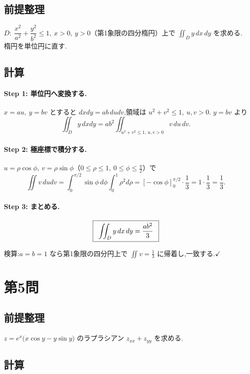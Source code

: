 \documentclass[11pt,a4paper]{article}
\begin{document}
\subsection*{前提整理}

$D:\ \dfrac{x^2}{a^2}+\dfrac{y^2}{b^2}\le1,\ x>0,\ y>0$（第1象限の四分楕円）上で
$\displaystyle\iint_D y\,dx\,dy$ を求める.楕円を単位円に直す.

\subsection*{計算}

\paragraph{Step 1: 単位円へ変換する.}
$x=au,\ y=bv$ とすると $dxdy=ab\,dudv$,領域は $u^2+v^2\le1,\ u,v>0$.
$y=bv$ より
\[
\iint_D y\,dxdy=ab^2\iint_{u^2+v^2\le1,\,u,v>0}v\,du\,dv.
\]

\paragraph{Step 2: 極座標で積分する.}
$u=\rho\cos\phi,\ v=\rho\sin\phi$（$0\le\rho\le1,\ 0\le\phi\le\frac\pi2$）で
\[
\iint v\,dudv=\int_0^{\pi/2}\!\!\sin\phi\,d\phi\int_0^1\!\rho^2 d\rho
=[-\cos\phi]_0^{\pi/2}\cdot\frac13=1\cdot\frac13=\frac13.
\]

\paragraph{Step 3: まとめる.}
\[
\ans{\ \iint_D y\,dx\,dy=\frac{ab^2}{3}\ }
\]

検算:$a=b=1$ なら第1象限の四分円上で $\iint v=\frac13$ に帰着し,一致する.$\checkmark$

\section*{第5問}

\subsection*{前提整理}

$z=e^x\bigl(x\cos y-y\sin y\bigr)$ のラプラシアン $z_{xx}+z_{yy}$ を求める.

\subsection*{計算}
\end{document}
